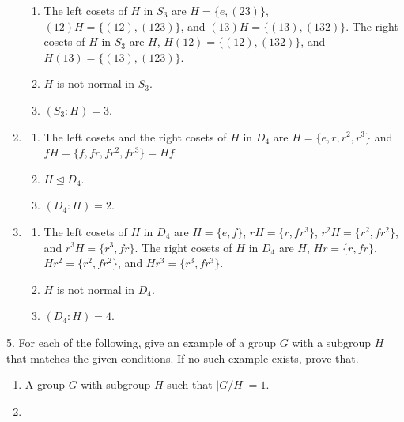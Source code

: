 \documentclass[10pt,]{book}
\theoremstyle{plain}
\theoremstyle{definition}
\theoremstyle{definition}
\theoremstyle{definition}
\theoremstyle{definition}
\numberwithin{equation}{section}
\begin{document}
\begin{exerciselist}
\begin{enumerate}[label=(\alph*)]
\begin{enumerate}[label=\roman*.]
\item\hypertarget{li-434}{}
            The left cosets of \(H\) in \(S_3\) are \(H=\{e,(23)\}\), \((12)H=\{(12),(123)\}\), and \((13)H=\{(13),(132)\}\). The right cosets of \(H\) in \(S_3\) are \(H\), \(H(12)=\{(12),(132)\}\), and \(H(13)=\{(13),(123)\}\).
\item\hypertarget{li-435}{}
            \(H\) is not normal in \(S_3\).
\item\hypertarget{li-436}{}
            \((S_3:H)=3\).
\end{enumerate}
%
\item\hypertarget{li-437}{}%
\begin{enumerate}[label=\roman*.]
\item\hypertarget{li-438}{}
            The left cosets and the right cosets of \(H\) in \(D_4\) are \(H=\{e,r,r^2,r^3\}\) and \(fH=\{f,fr, fr^2, fr^3\}=Hf\).
\item\hypertarget{li-439}{}
            \(H\unlhd D_4\).
\item\hypertarget{li-440}{}
            \((D_4:H)=2\).
\end{enumerate}
%
\item\hypertarget{li-441}{}%
\begin{enumerate}[label=\roman*.]
\item\hypertarget{li-442}{}
            The left cosets of \(H\) in \(D_4\) are \(H=\{e,f\}\), \(rH=\{r,fr^3\}\), \(r^2H=\{r^2,fr^2\}\), and \(r^3H=\{r^3, fr\}\). The right cosets of \(H\) in \(D_4\) are \(H\), \(Hr=\{r, fr\}\), \(Hr^2=\{r^2,fr^2\}\), and \(Hr^3=\{r^3, fr^3\}\).
\item\hypertarget{li-443}{}
            \(H\) is not normal in \(D_4\).
\item\hypertarget{li-444}{}
            \((D_4:H)=4\).
\end{enumerate}
%
\end{enumerate}
\item[5.]\hypertarget{exercise-54}{}
        For each of the following, give an example of a group \(G\) with a subgroup \(H\) that matches the given conditions. If no such example exists, prove that.
        \leavevmode%
\begin{enumerate}[label=(\alph*)]
\item\hypertarget{li-445}{}
              A group \(G\) with subgroup \(H\) such that \(|G/H|=1\).
\item\hypertarget{li-446}{}

\end{enumerate}
\end{exerciselist}
\end{document}
